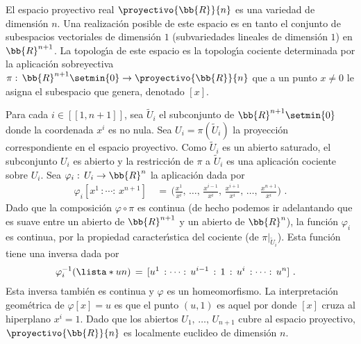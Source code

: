 \begin{ejemplo}%
El espacio proyectivo real $\proyectivo{\bb{R}}{n}$ es una variedad de
dimensi\'{o}n $n$. Una realizaci\'{o}n posible de este espacio es en tanto
el conjunto de subespacios vectoriales de dimensi\'{o}n $1$
(subvariedades lineales de dimensi\'{o}n $1$) en $\bb{R}^{n+1}$. La
topolog\'{\i}a de este espacio es la topolog\'{\i}a cociente determinada
por la aplicaci\'{o}n sobreyectiva
$\pi:\,\bb{R}^{n+1}\setmin\{0\}\rightarrow\proyectivo{\bb{R}}{n}$ que a un
punto $x\not =0$ le asigna el subespacio que genera, denotado $[x]$.

Para cada $i\in[\![1,n+1]\!]$, sea $\widetilde{U}_{i}$ el subconjunto de
$\bb{R}^{n+1}\setmin\{0\}$ donde la coordenada $x^{i}$ es no nula. Sea
$U_{i}=\pi(\widetilde{U}_{i})$ la proyecci\'{o}n correspondiente en el
espacio proyectivo. Como $\widetilde{U}_{i}$ es un abierto saturado, el
subconjunto $U_{i}$ es abierto y la restricci\'{o}n de $\pi$ a
$\widetilde{U}_{i}$ es una aplicaci\'{o}n cociente sobre $U_{i}$.
Sea $\varphi_{i}:\,U_{i}\rightarrow\bb{R}^{n}$ la aplicaci\'{o}n
dada por
\begin{align*}
	\varphi_{i}[x^{1}\,:\cdots:\,x^{n+1}] & \,=\,
		\Big(\frac{x^{1}}{x^{i}},\,\dots,\,\frac{x^{i-1}}{x^{i}},\,
			\frac{x^{i+1}}{x^{i}},\,\dots,\,\frac{x^{n+1}}{x^{i}}
			\Big)
	\text{ .}
\end{align*}
%
Dado que la composici\'{o}n $\varphi\circ\pi$ es continua (de hecho podemos
ir adelantando que es suave entre un abierto de $\bb{R}^{n+1}$ y un abierto
de $\bb{R}^{n}$), la funci\'{o}n $\varphi_{i}$ es continua, por la propiedad
caracter\'{\i}stica del cociente (de $\pi|_{\widetilde{U}_{i}}$). Esta
funci\'{o}n tiene una inversa dada por
\begin{align*}
	\varphi_{i}^{-1}(\lista*{u}{n}) & \,=\,
		[u^{1}\,:\dots:\,u^{i-1}\,:\,1\,:\,u^{i}\,:\dots:\,u^{n}]
	\text{ .}
\end{align*}
%
Esta inversa tambi\'{e}n es continua y $\varphi$ es un homeomorfismo.
La interpretaci\'{o}n geom\'{e}trica de $\varphi[x]=u$ es que el punto
$(u,1)$ es aquel por donde $[x]$ cruza al hiperplano $x^{i}=1$. Dado
que los abiertos $U_{1},\,\dots,\,U_{n+1}$ cubre al espacio proyectivo,
$\proyectivo{\bb{R}}{n}$ es localmente euclideo de dimensi\'{o}n $n$.


\end{ejemplo}
